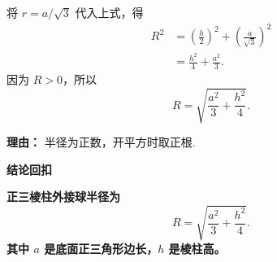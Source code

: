 \begin{proofbox}
\begin{description}[style=nextline, leftmargin=2.8em, labelsep=0.5em, itemsep=0.55em]
		\item[\textbf{步骤五（代入化简）：}] 将 $r=a/\sqrt3$ 代入上式，得
		      \[
			      \begin{aligned}
				      R^{2}
				       & =\left(\frac h2\right)^{2}+\left(\frac a{\sqrt3}\right)^{2} \\
				       & =\frac{h^{2}}{4}+\frac{a^{2}}{3}.
			      \end{aligned}
		      \]
		      因为 $R>0$，所以
		      \[
			      R=\sqrt{\frac{a^{2}}{3}+\frac{h^{2}}{4}}.
		      \]
		      \par\textbf{理由：} 半径为正数，开平方时取正根.
	\end{description}

	\medskip
	\textbf{\textcolor{CProof}{结论回扣}}

	\textbf{正三棱柱外接球半径为}
	\[
		\boxed{R=\sqrt{\frac{a^{2}}{3}+\frac{h^{2}}{4}}}.
	\]
	\textbf{其中 $a$ 是底面正三角形边长，$h$ 是棱柱高。}
\end{proofbox}